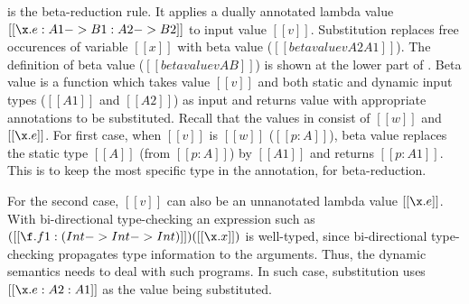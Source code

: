  is the beta-reduction rule. It applies a dually
annotated lambda value $[[\x.e : A1 -> B1 : A2 -> B2]]$ to input
value $[[v]]$. Substitution replaces free occurences of variable
$[[x]]$ with beta value ($[[betavalue v A2 A1]]$).
The definition of beta value ($[[betavalue v A B]]$) is shown at the lower part of
.
Beta value is a function which takes
value $[[v]]$ and both static and dynamic input types
($[[A1]]$ and $[[A2]]$) as input and returns value with
appropriate annotations to be substituted.
Recall that the values in \cal consist of $[[w]]$ and $[[\x.e]]$.
For first case, when $[[v]]$ is $[[w]]$ ($[[p:A]]$), beta value replaces the static type
$[[A]]$ (from $[[p:A]]$) by $[[A1]]$ and returns $[[p:A1]]$.
This is to keep the most specific type in the annotation, for beta-reduction.
\begin{comment}
Using only $[[A2]]$ may lead to ill-typed programs. Consider
the following example:
\[
  [[ (\x . e : Top -> Int : Int -> Int) (1:Int) ]]
  [[-->]] [[ (\x . e : Int->Int) (1:Int) ]]
  [[-->]] [[ e [ x~>1:Int ] ]]
\]
%
Here we assume that reduction does not keep the dynamic type of lambdas,
and we will not be able to know $[[A1]]$ when doing beta-reduction.
We further assume the lambda that contains a switch expression that analyzes
the function input. Say $[[e]]$ is $[[switch x Char e1 Bool e2]]$.
It is acceptable because $[[x]]$ has type $[[Top]]$.
The function expects a term of type top, but it is given a integer to.
The switch expression $[[e]]$, if we subsititute $[[x]]$ in it by $[[1 : Int]]$
it will be comes illegal because it has no branch dealt with an integer.
So we have to use the dynamic type $[[Top]]$ instead. And that is why
we need to keep two annotations for an lambda.
\end{comment}
For the second case, $[[v]]$ can also be an unnanotated lambda value $[[\x.e]]$.
With bi-directional type-checking an expression such as
$([[\f.f 1: (Int -> Int -> Int)]]) ([[\x.x]])$
is well-typed, since bi-directional type-checking propagates
type information to the arguments. Thus, the dynamic semantics
needs to deal with such programs.
In such case, substitution uses $[[\x.e:A2:A1]]$ as the value being substituted.





